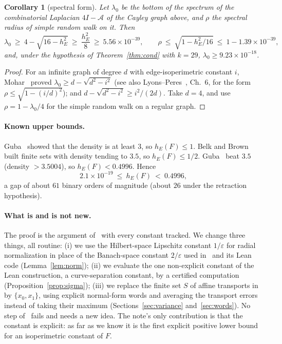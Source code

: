 \documentclass[11pt]{article}
\newtheorem{corollary}[theorem]{Corollary}
\theoremstyle{definition}
\theoremstyle{remark}
\newcommand{\hE}{h_E}
\begin{document}
\begin{corollary}[spectral form]\label{cor:spec}
Let $\lambda_0$ be the bottom of the spectrum of the combinatorial Laplacian $4I-\mathcal A$ of
the Cayley graph above, and $\rho$ the spectral radius of simple random walk on it. Then
\[
  \lambda_0\ \ge\ 4-\sqrt{16-\hE^2}\ \ge\ \frac{\hE^2}{8}\ \ge\ 5.56\times10^{-39},
  \qquad \rho\ \le\ \sqrt{1-\hE^2/16}\ \le\ 1-1.39\times10^{-39},
\]
and, under the hypothesis of Theorem~\ref{thm:cond} with $k=29$, $\lambda_0\ge 9.23\times10^{-18}$.
\end{corollary}
\begin{proof}
For an infinite graph of degree $d$ with edge-isoperimetric constant $i$, Mohar~\cite{Mohar}
proved $\lambda_0\ge d-\sqrt{d^2-i^2}$ (see also Lyons--Peres~\cite{LP}, Ch.~6, for the form $\rho\le\sqrt{1-(i/d)^2}$); and $d-\sqrt{d^2-i^2}\ge i^2/(2d)$. Take $d=4$, and use
$\rho=1-\lambda_0/4$ for the simple random walk on a regular graph.
\end{proof}

\paragraph{Known upper bounds.}
Guba~\cite{Guba2004} showed that the density is at least $3$, so $\hE(F)\le1$. Belk and
Brown~\cite{BelkBrown} built finite sets with density tending to $3.5$, so $\hE(F)\le1/2$.
Guba~\cite{Guba2025} beat $3.5$ (density $>3.5004$), so $\hE(F)<0.4996$. Hence
\[
 2.1\times10^{-19}\ \le\ \hE(F)\ <\ 0.4996 ,
\]
a gap of about $61$ binary orders of magnitude (about $26$ under the retraction hypothesis).

\paragraph{What is and is not new.}
The proof is the argument of~\cite{OAI} with every constant tracked. We change three things, all
routine: (i) we use the Hilbert-space Lipschitz constant $1/\varepsilon$ for radial normalization
in place of the Banach-space constant $2/\varepsilon$ used in~\cite{OAI} and its Lean code
(Lemma~\ref{lem:norm}); (ii) we evaluate the one non-explicit constant of the Lean construction,
a curve-separation constant, by a certified computation (Proposition~\ref{prop:sigma});
(iii) we replace the finite set $S$ of affine transports in~\cite{OAI} by $\{x_0,x_1\}$, using
explicit normal-form words and averaging the transport errors instead of taking their maximum
(Sections~\ref{sec:variance} and~\ref{sec:words}). No step of~\cite{OAI} fails and needs a new
idea. The note's only contribution is that the constant is explicit: as far as we know it is the
first explicit positive lower bound for an isoperimetric constant of $F$.
\end{document}

